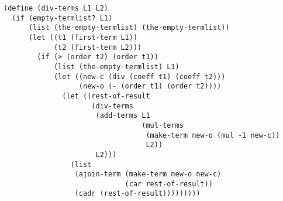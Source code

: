 \documentclass[a4paper,12pt]{article}
\begin{document}
\begin{lstlisting}
(define (div-terms L1 L2)
  (if (empty-termlist? L1)
      (list (the-empty-termlist) (the-empty-termlist))
      (let ((t1 (first-term L1))
            (t2 (first-term L2)))
        (if (> (order t2) (order t1))
            (list (the-empty-termlist) L1)
            (let ((new-c (div (coeff t1) (coeff t2)))
                  (new-o (- (order t1) (order t2))))
              (let ((rest-of-result
                     (div-terms
                      (add-terms L1
                                 (mul-terms
                                  (make-term new-o (mul -1 new-c))
                                  L2))
                      L2)))
                (list
                 (ajoin-term (make-term new-o new-c)
                             (car rest-of-result))
                 (cadr (rest-of-result)))))))))
\end{lstlisting}
\end{document}
